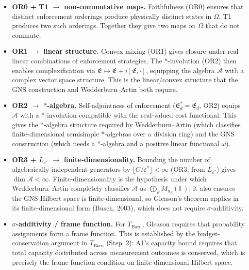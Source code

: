 \documentclass[11pt]{article}
\begin{document}
\begin{itemize}[nosep,leftmargin=2em,itemsep=4pt]
  \item \textbf{OR0 + T1 $\to$ non-commutative maps.}  Faithfulness (OR0) ensures that distinct enforcement orderings produce physically distinct states in $\Omega$.  T1 produces two such orderings.  Together they give two maps on $\Omega$ that do not commute.

  \item \textbf{OR1 $\to$ linear structure.}  Convex mixing (OR1) gives closure under real linear combinations of enforcement strategies.  The $*$-involution (OR2) then enables complexification via $\mathfrak{E} \mapsto \mathfrak{E} + i[\mathfrak{E},\cdot]$, equipping the algebra $\mathcal{A}$ with a complex vector space structure.  This is the linear/convex structure that the GNS construction and Wedderburn--Artin both require.

  \item \textbf{OR2 $\to$ $*$-algebra.}  Self-adjointness of enforcement ($\mathfrak{E}_d^* = \mathfrak{E}_d$, OR2) equips $\mathcal{A}$ with a $*$-involution compatible with the real-valued cost functional.  This gives the $*$-algebra structure required by Wedderburn--Artin (which classifies finite-dimensional semisimple $*$-algebras over a division ring) and the GNS construction (which needs a $*$-algebra and a positive linear functional $\omega$).

  \item \textbf{OR3 + $L_{\varepsilon^*}$ $\to$ finite-dimensionality.}  Bounding the number of algebraically independent generators by $\lfloor C/\varepsilon^* \rfloor < \infty$ (OR3, from $L_{\varepsilon^*}$) gives $\dim \mathcal{A} < \infty$.  Finite-dimensionality is the hypothesis under which Wedderburn--Artin completely classifies $\mathcal{A}$ as $\bigoplus_k M_{n_k}(\mathbb{F})$; it also ensures the GNS Hilbert space is finite-dimensional, so Gleason's theorem applies in its finite-dimensional form (Busch, 2003), which does not require $\sigma$-additivity.

  \item \textbf{$\sigma$-additivity / frame function.}  For $T_{\mathrm{Born}}$, Gleason requires that probability assignments form a frame function.  This is established by the budget-conservation argument in $T_{\mathrm{Born}}$ (Step~2): A1's capacity bound requires that total capacity distributed across measurement outcomes is conserved, which is precisely the frame function condition on finite-dimensional Hilbert space.
\end{itemize}
\end{document}
